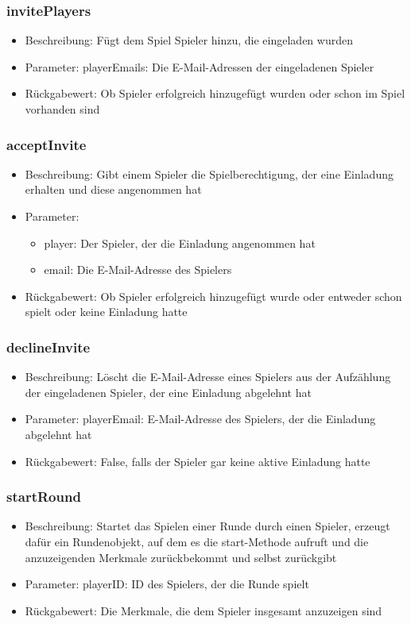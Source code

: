 \documentclass[a4paper]{scrreprt}
\begin{document}
	\subsubsection{invitePlayers}
	\begin{itemize}
		\item Beschreibung: Fügt dem Spiel Spieler hinzu, die eingeladen wurden
		\item Parameter: playerEmails: Die E-Mail-Adressen der eingeladenen Spieler
		\item Rückgabewert: Ob Spieler erfolgreich hinzugefügt wurden oder schon im Spiel vorhanden sind
	\end{itemize}
	\subsubsection{acceptInvite}
	\begin{itemize}
		\item Beschreibung: Gibt einem Spieler die Spielberechtigung, der eine Einladung erhalten und diese angenommen hat
		\item Parameter:
		\begin{itemize}
			\item player: Der Spieler, der die Einladung angenommen hat
			\item email: Die E-Mail-Adresse des Spielers
		\end{itemize}
		\item Rückgabewert: Ob Spieler erfolgreich hinzugefügt wurde oder entweder schon spielt oder keine Einladung hatte
	\end{itemize}
	\subsubsection{declineInvite}
	\begin{itemize}
		\item Beschreibung: Löscht die E-Mail-Adresse eines Spielers aus der Aufzählung der eingeladenen Spieler, der eine Einladung abgelehnt hat
		\item Parameter: playerEmail: E-Mail-Adresse des Spielers, der die Einladung abgelehnt hat
		\item Rückgabewert: False, falls der Spieler gar keine aktive Einladung hatte
	\end{itemize}
	\subsubsection{startRound}
	\begin{itemize}
		\item Beschreibung: Startet das Spielen einer Runde durch einen Spieler, erzeugt dafür ein Rundenobjekt, auf dem es die start-Methode aufruft und die anzuzeigenden Merkmale zurückbekommt und selbst zurückgibt
		\item Parameter: playerID: ID des Spielers, der die Runde spielt
		\item Rückgabewert: Die Merkmale, die dem Spieler insgesamt anzuzeigen sind
	\end{itemize}
\end{document}
